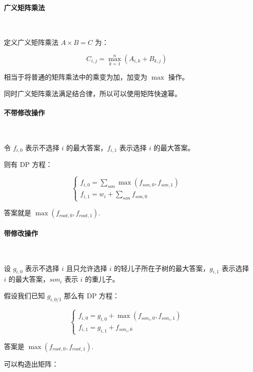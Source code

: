 \paragraph{广义矩阵乘法}~{}
\par

定义广义矩阵乘法 $A\times B=C$ 为：

$$
C_{i,j}=\max_{k=1}^{n}(A_{i,k}+B_{k,j})
$$

相当于将普通的矩阵乘法中的乘变为加，加变为 $\max$ 操作。\par

同时广义矩阵乘法满足结合律，所以可以使用矩阵快速幂。\par

\paragraph{不带修改操作}~{}
\par

令 $f_{i,0}$ 表示不选择 $i$ 的最大答案，$f_{i,1}$ 表示选择 $i$ 的最大答案。\par

则有 DP 方程：

$$
\begin{cases}f_{i,0}=\sum_{son}\max(f_{son,0},f_{son,1})\\f_{i,1}=w_i+\sum_{son}f_{son,0}\end{cases}
$$

答案就是 $\max(f_{root,0},f_{root,1})$.\par

\paragraph{带修改操作}~{}
\par


设 $g_{i,0}$ 表示不选择 $i$ 且只允许选择 $i$ 的轻儿子所在子树的最大答案，$g_{i,1}$ 表示选择 $i$ 的最大答案，$son_i$ 表示 $i$ 的重儿子。\par

假设我们已知 $g_{i,0/1}$ 那么有 DP 方程：

$$
\begin{cases}f_{i,0}=g_{i,0}+\max(f_{son_i,0},f_{son_i,1})\\f_{i,1}=g_{i,1}+f_{son_i,0}\end{cases}
$$

答案是 $\max(f_{root,0},f_{root,1})$.\par

可以构造出矩阵：

